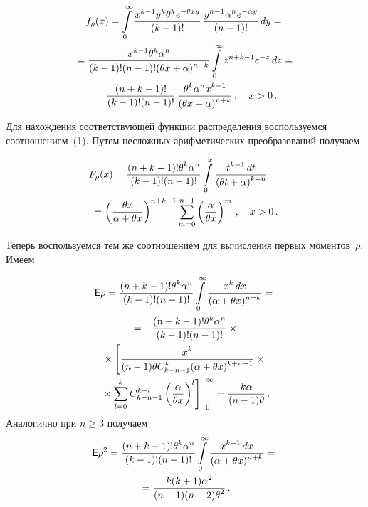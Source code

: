 \begin{multicols}{2}
\noindent
\begin{multline*}
f_\rho(x)=\int\limits_0^\infty\fr{x^{k-1}y^k\theta^ke^{-\theta xy}}{(k-1)!}\,\fr{y^{n-1}\alpha^ne^{-\alpha
y}}{(n-1)!}\, dy={}\\
{}=\fr{x^{k-1}\theta^k\alpha^n}{(k-1)!(n-1)!(\theta x+\alpha)^{n+k}}\int\limits_0^\infty z^{n+k-1}e^{-z}\,
dz={}\\
{}=
\fr{(n+k-1)!}{(k-1)!(n-1)!}\,\fr{\theta^k\alpha^nx^{k-1}}{(\theta x+\alpha)^{n+k}}\,, \quad x>0\,.
\end{multline*}

Для нахождения соответствующей функции распределения воспользуемся соотношением~(1). %
 Путем несложных арифметических
преобразований получаем

\vspace*{-4pt}


\noindent
\begin{multline*}
F_\rho(x)=\fr{(n+k-1)!\theta^k\alpha^n}{(k-1)!(n-1)!}\int\limits_0^x \fr{t^{k-1}\,
dt}{(\theta t+\alpha)^{k+n}} ={}\\
{}=
\left(\fr{\theta x}{\alpha+\theta
x}\right)^{n+k-1}\sum\limits_{m=0}^{n-1}\left(\fr{\alpha}{\theta x}\right)^m\,,\quad x>0\,.
\end{multline*}

Теперь воспользуемся тем же соотношением для вычисления первых моментов~$\rho$. Имеем

\noindent
\begin{multline*}
\e\rho=\fr{(n+k-1)!\theta^k\alpha^n}{(k-1)!(n-1)!}\int\limits_0^\infty \fr{x^k\, dx}{(\alpha+\theta x)^{n+k}}={}\\
{}=-\fr{(n+k-1)!\theta^k\alpha^n}{(k-1)!(n-1)!}\times{}\\
{}\times \left[\fr{x^k}{(n-1)\theta
C_{k+n-1}^k(\alpha+\theta x)^{k+n-1}}\times{}\right.\\
\left.{}\times \sum\limits_{l=0}^kC_{k+n-1}^{k-l}\left(\fr{\alpha}{\theta x}
\right)^l\right]\Bigg|_0^\infty= \fr{k\alpha}{(n-1)\theta}\,.
\end{multline*}
Аналогично при $n\ge3$ получаем
\begin{multline*}
\e\rho^2=\fr{(n+k-1)!\theta^k\alpha^n}{(k-1)!(n-1)!}\int\limits_0^\infty \fr{x^{k+1}\, dx}{(\alpha+\theta
x)^{n+k}}={}\\
{}=\fr{k(k+1)\alpha^2}{(n-1)(n-2)\theta^2}\,.
\end{multline*}


\end{multicols}
